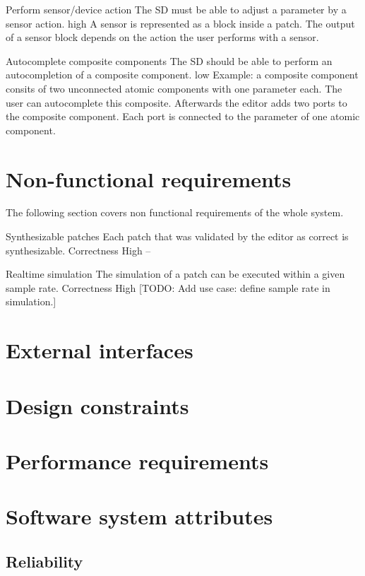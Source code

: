 	{Perform sensor/device action}
	{The SD must be able to adjust a parameter by a sensor action.}
	{high}
	{A sensor is represented as a block inside a patch. The output of a sensor block depends on the action the user performs with a sensor.}
	
	{Autocomplete composite components}
	{The SD should be able to perform an autocompletion of a composite component.}
	{low}
	{Example: a composite component consits of two unconnected atomic components with one parameter each. The user can autocomplete this composite. Afterwards the editor adds two ports to the composite component. Each port is connected to the parameter of one atomic component.}
	
	\section{Non-functional requirements}
	
	The following section covers non functional requirements of the whole system.
	
	{Synthesizable patches}
	{Each patch that was validated by the editor as correct is synthesizable.}
	{Correctness}
	{High}
	{--}
	
	{Realtime simulation}
	{The simulation of a patch can be executed within a given sample rate.}
	{Correctness}
	{High}
	{[TODO: Add use case: define sample rate in simulation.]}
	
	
	\section{External interfaces}
	\section{Design constraints}
	\section{Performance requirements}
	\section{Software system attributes}
		\subsection{Reliability}
		
